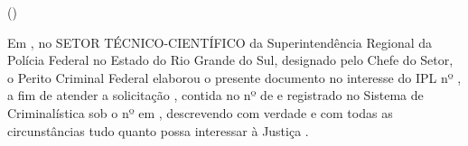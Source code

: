 \noindent\textbf{\MakeUppercase{\pfdocnamenum}}

\begin{center}
	\bigskip
	\textbf{\MakeUppercase{\pfdoctitle}}
	
	\ifx\pfdocsubtitle\empty
	\else
		(\MakeUppercase{\pfdocsubtitle})
	\fi
\end{center}

\bigskip

Em 
\pfdocdate,	no SETOR TÉCNICO-CIENTÍFICO da Superintendência
Regional da Polícia Federal no Estado do Rio Grande do Sul, designado pelo Chefe do Setor,	o Perito Criminal Federal 
\MakeUppercase{\pfauthor}\space elaborou o presente documento no interesse do IPL nº 
\pfipl, a fim de atender a solicitação 
\pfclient, contida no 
\pfexptype\space nº \pfexpnum\space de \pfexpdate\space	e registrado no Sistema de Criminalística sob o nº 
\pfregnum\space em \pfregdate, descrevendo com verdade e com todas as circunstâncias tudo quanto possa interessar à Justiça%
.

